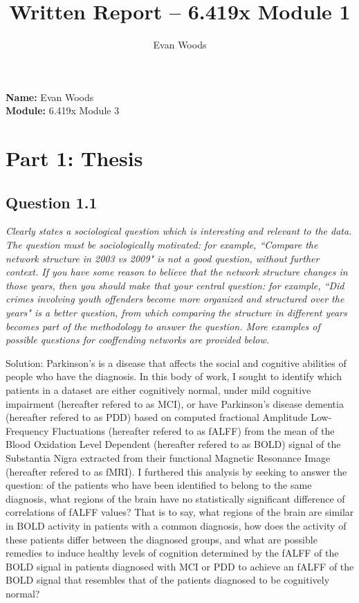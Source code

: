 \documentclass[12pt]{article}
\title{Written Report – 6.419x Module 1}
\author{Evan Woods}
\date{}
\begin{document}
\maketitle

\tableofcontents
\newpage


\noindent \textbf{Name:} Evan Woods \\
\noindent \textbf{Module:} 6.419x Module 3

\section{Part 1: Thesis}

\subsection{Question 1.1}
\textit{Clearly states a sociological question which is interesting and relevant to the data. The question must be sociologically motivated: for example, “Compare the network structure in 2003 vs 2009" is not a good question, without further context. If you have some reason to believe that the network structure changes in those years, then you should make that your central question: for example, “Did crimes involving youth offenders become more organized and structured over the years" is a better question, from which comparing the structure in different years becomes part of the methodology to answer the question. More examples of possible questions for cooffending networks are provided below. }

Solution: Parkinson's is a disease that affects the social and cognitive abilities of people who have the diagnosis. In this body of work, I sought to identify which patients in a dataset are either cognitively normal, under mild cognitive impairment (hereafter refered to as MCI), or have Parkinson's disease dementia (hereafter refered to as PDD) based on computed fractional Amplitude Low-Frequency Fluctuations (hereafter refered to as fALFF) from the mean of the Blood Oxidation Level Dependent (hereafter refered to as BOLD) signal of the Substantia Nigra extracted from their functional Magnetic Resonance Image (hereafter refered to as fMRI). I furthered this analysis by seeking to answer the question: of the patients who have been identified to belong to the same diagnosis, what regions of the brain have no statistically significant difference of correlations of fALFF values? That is to say, what regions of the brain are similar in BOLD activity in patients with a common diagnosis, how does the activity of these patients differ between the diagnosed groups, and what are possible remedies to induce healthy levels of cognition determined by the fALFF of the BOLD signal in patients diagnosed with MCI or PDD to achieve an fALFF of the BOLD signal that resembles that of the patients diagnosed to be cognitively normal?   
\end{document}
